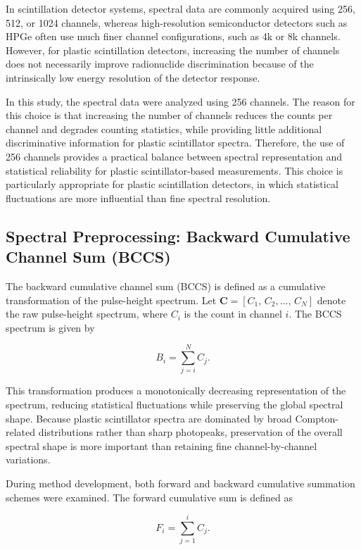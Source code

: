 \documentclass[fleqn, 10pt]{wlscirep}
\begin{document}
In scintillation detector systems, spectral data are commonly acquired using 256, 512, or 1024 channels, whereas high-resolution semiconductor detectors such as HPGe often use much finer channel configurations, such as 4k or 8k channels. However, for plastic scintillation detectors, increasing the number of channels does not necessarily improve radionuclide discrimination because of the intrinsically low energy resolution of the detector response.

In this study, the spectral data were analyzed using 256 channels. The reason for this choice is that increasing the number of channels reduces the counts per channel and degrades counting statistics, while providing little additional discriminative information for plastic scintillator spectra. Therefore, the use of 256 channels provides a practical balance between spectral representation and statistical reliability for plastic scintillator-based measurements. This choice is particularly appropriate for plastic scintillation detectors, in which statistical
fluctuations are more influential than fine spectral resolution.


\subsection*{Spectral Preprocessing: Backward Cumulative Channel Sum (BCCS)}

The backward cumulative channel sum (BCCS) is defined as a cumulative transformation of the pulse-height spectrum. Let $\mathbf{C} = [C_1,\,C_2,\ldots,\,C_N]$ denote the raw pulse-height spectrum, where $C_i$ is the count in channel $i$. The BCCS spectrum is given by

\begin{equation}
B_i = \sum_{j=i}^N C_j. \label{eq:BCCS}
\end{equation}

This transformation produces a monotonically decreasing representation of the spectrum, reducing statistical fluctuations while preserving the global spectral shape. Because plastic scintillator spectra are dominated by broad Compton-related distributions rather than sharp photopeaks, preservation of the overall spectral shape is more important than retaining fine channel-by-channel variations.


During method development, both forward and backward cumulative summation schemes were examined. The forward cumulative sum is defined as

$$
F_i = \sum_{j=1}^i C_j. \label{eq_FCCS}
$$
\end{document}
